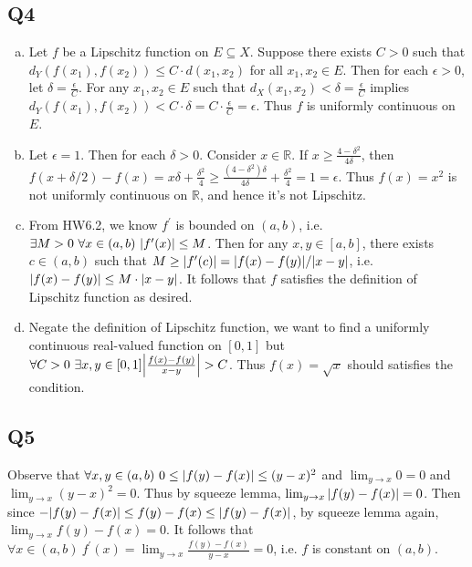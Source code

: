 \documentclass[12pt,lettersize]{article}
\newcommand{\R}{\mathbb{R}}
\begin{document}
	\subsection*{Q4}
	\begin{enumerate}[(a)]
		\item Let $f$ be a Lipschitz function on $E\subseteq X$. Suppose there exists $C>0$ such that $d_Y(f(x_1),f(x_2))\leq C\cdot d(x_1,x_2)$ for all $x_1,x_2\in E$. Then for each $\epsilon>0$, let $\delta=\frac{\epsilon}{C}$. For any $x_1,x_2\in E$ such that $d_X(x_1,x_2)<\delta=\frac{\epsilon}{C}$ implies $d_Y(f(x_1),f(x_2))<C\cdot\delta=C\cdot\frac{\epsilon}{C}=\epsilon$. Thus $f$ is uniformly continuous on $E$.
		
		\item Let $\epsilon=1$. Then for each $\delta>0$. Consider $x\in\R$. If $x\geq\frac{4-\delta^2}{4\delta}$, then $f(x+\delta/2)-f(x)=x\delta+\frac{\delta^2}{4}\geq \frac{(4-\delta^2)\delta}{4\delta}+\frac{\delta^2}{4}=1=\epsilon$. Thus $f(x)=x^2$ is not uniformly continuous on $\R$, and hence it's not Lipschitz.
		
		\item From HW6.2, we know $f^\prime$ is bounded on $(a,b)$, i.e. $\exists M>0\ \forall x\in(a,b)\ \abs{f^\prime(x)}\leq M$. Then for any $x,y\in[a,b]$, there exists $c\in(a,b)$ such that $M\geq \abs{f^\prime(c)}=\abs{f(x)-f(y)}/\abs{x-y}$, i.e. $\abs{f(x)-f(y)}\leq M\cdot\abs{x-y}$. It follows that $f$ satisfies the definition of Lipschitz function as desired.
		
		\item Negate the definition of Lipschitz function, we want to find a uniformly continuous real-valued function on $[0,1]$ but $\forall C>0\ \exists x,y\in[0,1] \abs{\frac{f(x)-f(y)}{x-y}}>C$. Thus $f(x)=\sqrt{x}$ should satisfies the condition.
	\end{enumerate}
	\newpage
	
	\subsection*{Q5}
	Observe that $\forall x,y\in(a,b)\ 0\leq\abs{f(y)-f(x)}\leq(y-x)^2$ and $\lim_{y\rightarrow x}0=0$ and $\lim_{y\rightarrow x}(y-x)^2=0$. Thus by squeeze lemma, $\lim_{y\rightarrow x}\abs{f(y)-f(x)}=0$. Then since $-\abs{f(y)-f(x)}\leq f(y)-f(x)\leq\abs{f(y)-f(x)}$, by squeeze lemma again, $\lim_{y\rightarrow x}f(y)-f(x)=0$. It follows that $\forall x\in(a,b)\ f^\prime(x)=\lim_{y\rightarrow x}\frac{f(y)-f(x)}{y-x}=0$, i.e. $f$ is constant on $(a,b)$. 
	\newpage
	
\end{document}
